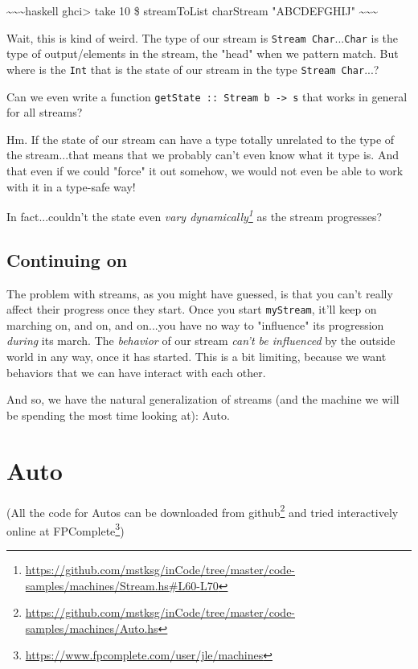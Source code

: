 \documentclass[]{article}
\renewcommand{\href}[2]{#2\footnote{\url{#1}}}
\begin{document}
\textasciitilde{}\textasciitilde{}\textasciitilde{}haskell ghci\textgreater{}
take 10 \$ streamToList charStream "ABCDEFGHIJ"
\textasciitilde{}\textasciitilde{}\textasciitilde{}

Wait, this is kind of weird. The type of our stream is
\texttt{Stream\ Char}...\texttt{Char} is the type of output/elements in the
stream, the "head" when we pattern match. But where is the \texttt{Int} that is
the state of our stream in the type \texttt{Stream\ Char}...?

Can we even write a function
\texttt{getState\ ::\ Stream\ b\ -\textgreater{}\ s} that works in general for
all streams?

Hm. If the state of our stream can have a type totally unrelated to the type of
the stream...that means that we probably can't even know what it type is. And
that even if we could "force" it out somehow, we would not even be able to work
with it in a type-safe way!

In fact...couldn't the state even
\emph{\href{https://github.com/mstksg/inCode/tree/master/code-samples/machines/Stream.hs\#L60-L70}{vary
dynamically}} as the stream progresses?

\subsection{Continuing on}

The problem with streams, as you might have guessed, is that you can't really
affect their progress once they start. Once you start \texttt{myStream}, it'll
keep on marching on, and on, and on...you have no way to "influence" its
progression \emph{during} its march. The \emph{behavior} of our stream
\emph{can't be influenced} by the outside world in any way, once it has started.
This is a bit limiting, because we want behaviors that we can have interact with
each other.

And so, we have the natural generalization of streams (and the machine we will
be spending the most time looking at): Auto.

\section{Auto}

(All the code for Autos can be downloaded
\href{https://github.com/mstksg/inCode/tree/master/code-samples/machines/Auto.hs}{from
github} and tried interactively online
\href{https://www.fpcomplete.com/user/jle/machines}{at FPComplete})
\end{document}
